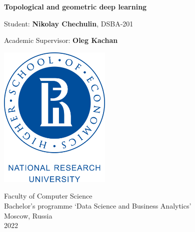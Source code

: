 \graphicspath{ {./assets/} }

\begin{titlepage}
   \begin{center}
        \vspace*{1cm}
        
        {\huge \textbf{Topological and geometric deep learning}}
        
        \vspace{0.5cm}
        
        \vspace{1.5cm}
        
        {\large Student: \textbf{Nikolay Chechulin}, DSBA-201}

        {\large Academic Supervisor: \textbf{Oleg Kachan}}
        
        \vfill
        \vspace{1.5cm}
        
        \includegraphics[width=0.4\textwidth]{Higher_School_of_Economics_Logo}
        
        Faculty of Computer Science\\            
        Bachelor's programme `Data Science and Business Analytics'\\
        Moscow, Russia\\
        2022
            
   \end{center}
\end{titlepage}
